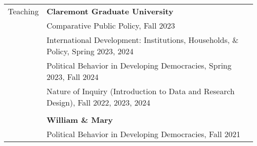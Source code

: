 \documentclass[letterpaper, 10.5pt]{article}
\begin{document}
\begin{longtable}{p{1.5in}p{5in}}
% 
% 
%   
%   
%
%  
% 
% 
%
%
% 
{{Teaching}}  & \textbf{Claremont Graduate University} \\
& Comparative Public Policy,  Fall 2023\\
&International Development: Institutions, Households, \& Policy, Spring 2023, 2024\\
&Political Behavior in Developing Democracies, Spring 2023, Fall 2024\\
&Nature of Inquiry (Introduction to Data and Research Design), Fall 2022, 2023, 2024 \\
&\\


& \textbf{William \& Mary} \\
&Political Behavior in Developing Democracies, Fall 2021 \\



\end{longtable}
\end{document}
